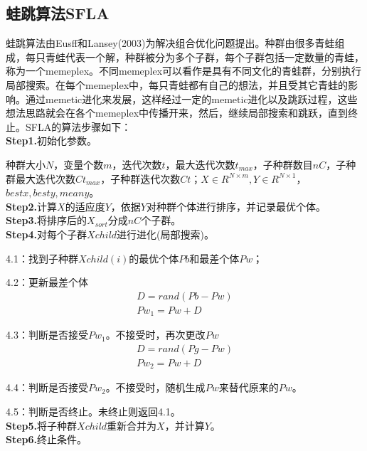     \subsection{蛙跳算法SFLA}
        \par
        蛙跳算法由Eusff和Lansey(2003)为解决组合优化问题提出。种群由很多青蛙组成，每只青蛙代表一个解，种群被分为多个子群，每个子群包括一定数量的青蛙，称为一个memeplex。不同memeplex可以看作是具有不同文化的青蛙群，分别执行局部搜索。在每个memeplex中，每只青蛙都有自己的想法，并且受其它青蛙的影响。通过memetic进化来发展，这样经过一定的memetic进化以及跳跃过程，这些想法思路就会在各个memeplex中传播开来，然后，继续局部搜索和跳跃，直到终止。SFLA的算法步骤如下：\\
        \textbf{Step1.}初始化参数。
        \par
        种群大小$N$，变量个数$m$，迭代次数$t$，最大迭代次数$t_{max}$，子种群数目$nC$，子种群最大迭代次数$Ct_{max}$，子种群迭代次数$Ct$；$X\in R^{N\times m},Y\in R^{N\times 1}$，$bestx,besty,meany$。\\
        \textbf{Step2.}计算$X$的适应度$Y$，依据$Y$对种群个体进行排序，并记录最优个体。\\
        \textbf{Step3.}将排序后的$X_{sort}$分成$nC$个子群。\\
        \textbf{Step4.}对每个子群$Xchild$进行进化(局部搜索)。
        \par
        4.1：找到子种群$Xchild(i)$的最优个体$Pb$和最差个体$Pw$；
        \par
        4.2：更新最差个体
        \begin{align*}
        D = rand(Pb - Pw)\\
        Pw_1 = Pw+D
        \end{align*}
        \par
        4.3：判断是否接受$Pw_1$。不接受时，再次更改$Pw$
        \begin{align*}
        D = rand(Pg - Pw)\\
        Pw_2 = Pw+D
        \end{align*}
        \par
        4.4：判断是否接受$Pw_2$。不接受时，随机生成$Pw$来替代原来的$Pw$。
        \par
        4.5：判断是否终止。未终止则返回4.1。\\
        \textbf{Step5.}将子种群$Xchild$重新合并为$X$，并计算$Y$。\\
        \textbf{Step6.}终止条件。



